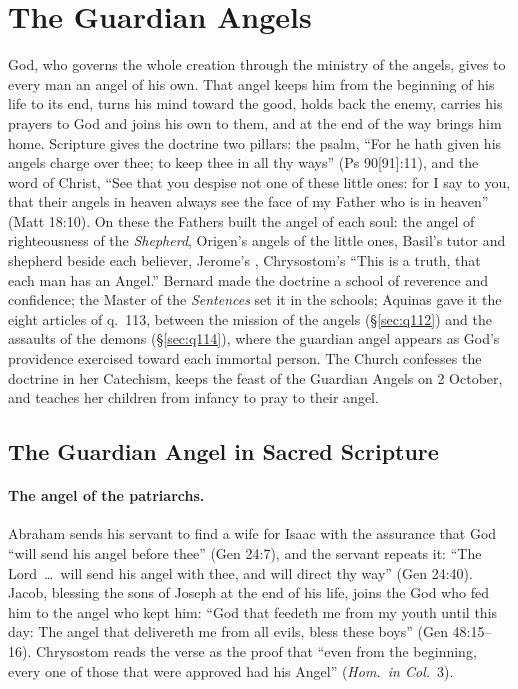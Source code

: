 \section{The Guardian Angels}\label{sec:guardians}

God, who governs the whole creation through the ministry of the angels,
gives to every man an angel of his own. That angel keeps him from the
beginning of his life to its end, turns his mind toward the good, holds back
the enemy, carries his prayers to God and joins his own to them, and at the
end of the way brings him home. Scripture gives the doctrine two pillars:
the psalm, ``For he hath given his angels charge over thee; to keep thee in
all thy ways'' (Ps 90[91]:11), and the word of Christ, ``See that you
despise not one of these little ones: for I say to you, that their angels in
heaven always see the face of my Father who is in heaven'' (Matt 18:10). On
these the Fathers built the angel of each soul: the angel of righteousness
of the \emph{Shepherd}, Origen's angels of the little ones, Basil's tutor
and shepherd beside each believer, Jerome's , Chrysostom's ``This is a truth, that each man has an Angel.'' Bernard made
the doctrine a school of reverence and confidence; the Master of the
\emph{Sentences} set it in the schools; Aquinas gave it the eight articles of
q.~113, between the mission of the angels (\S\ref{sec:q112}) and the
assaults of the demons (\S\ref{sec:q114}), where the guardian angel appears
as God's providence exercised toward each immortal person. The Church
confesses the doctrine in her Catechism, keeps the feast of the Guardian
Angels on 2 October, and teaches her children from infancy to pray to their
angel.

\sectionguard
\subsection{The Guardian Angel in Sacred Scripture}\label{sec:gd-scripture}

\paragraph{The angel of the patriarchs.} Abraham sends his servant to find a
wife for Isaac with the assurance that God ``will send his angel before
thee'' (Gen 24:7), and the servant repeats it: ``The Lord~\dots\ will send
his angel with thee, and will direct thy way'' (Gen 24:40). Jacob, blessing
the sons of Joseph at the end of his life, joins the God who fed him to the
angel who kept him: ``God that feedeth me from my youth until this day: The
angel that delivereth me from all evils, bless these boys'' (Gen
48:15--16). Chrysostom reads the verse as the proof that ``even from the
beginning, every one of those that were approved had his Angel'' (\emph{Hom.\
in Col.}\ 3).

